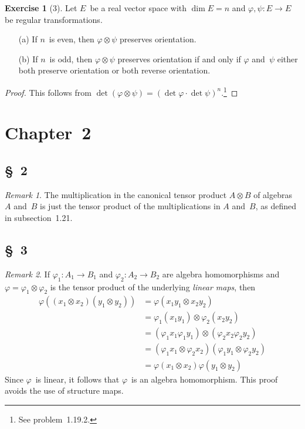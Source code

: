 \documentclass[letterpaper,12pt]{article}
\newcommand{\mult}{\cdot}
\newcommand{\tprod}{\otimes}
\theoremstyle{definition}
\newtheorem*{exer}{Exercise}
\theoremstyle{remark}
\newtheorem*{rmk}{Remark}
\begin{document}
\begin{exer}[3]
Let \(E\)~be a real vector space with \(\dim E=n\) and \(\varphi,\psi:E\to E\) be regular transformations.
\begin{enumerate}
\item[(a)] If \(n\)~is even, then \(\varphi\tprod\psi\) preserves orientation.
\item[(b)] If \(n\)~is odd, then \(\varphi\tprod\psi\) preserves orientation if and only if \(\varphi\) and~\(\psi\) either both preserve orientation or both reverse orientation.
\end{enumerate}
\end{exer}
\begin{proof}
This follows from \(\det(\varphi\tprod\psi)=(\det\varphi\mult\det\psi)^n\).\footnote{See problem~1.19.2.}
\end{proof}

\section*{Chapter~2}
\subsection*{\S~2}
\begin{rmk}
The multiplication in the canonical tensor product \(A\tprod B\) of algebras \(A\) and~\(B\) is just the tensor product of the multiplications in \(A\) and~\(B\), as defined in subsection~1.21.
\end{rmk}

\subsection*{\S~3}
\begin{rmk}
If \(\varphi_1:A_1\to B_1\) and \(\varphi_2:A_2\to B_2\) are algebra homomorphisms and \(\varphi=\varphi_1\tprod\varphi_2\) is the tensor product of the underlying \emph{linear maps}, then
\begin{align*}
\varphi((x_1\tprod x_2)(y_1\tprod y_2))&=\varphi(x_1y_1\tprod x_2y_2)\\
	&=\varphi_1(x_1y_1)\tprod\varphi_2(x_2y_2)\\
	&=(\varphi_1x_1\varphi_1y_1)\tprod(\varphi_2x_2\varphi_2y_2)\\
	&=(\varphi_1x_1\tprod\varphi_2 x_2)(\varphi_1y_1\tprod\varphi_2 y_2)\\
	&=\varphi(x_1\tprod x_2)\varphi(y_1\tprod y_2)
\end{align*}
Since \(\varphi\)~is linear, it follows that \(\varphi\)~is an algebra homomorphism. This proof avoids the use of structure maps.
\end{rmk}
\end{document}
